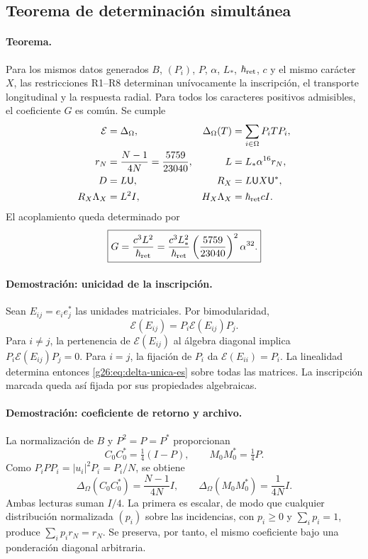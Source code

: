 \subsection{Teorema de determinación simultánea}

\paragraph{Teorema.}
Para los mismos datos generados \(B\), \((P_i)\), \(P\),
\(\alpha\), \(L_*\), \(\hbar_{\rm ret}\), \(c\) y el mismo carácter
\(X\), las restricciones R1--R8 determinan unívocamente la inscripción,
el transporte longitudinal y la respuesta radial. Para todos los
caracteres positivos admisibles, el coeficiente \(G\) es común. Se cumple
\begin{align}
 \mathcal E&=\Delta_\Omega,
 &\Delta_\Omega(T)&=\sum_{i\in\Omega}P_iTP_i,\label{g26:eq:delta-unica-es}\\
 r_N&=\frac{N-1}{4N}=\frac{5759}{23040},
 &L&=L_*\alpha^{16}r_N,\label{g26:eq:longitud-unica-es}\\
 D&=L\mathsf U,
 &R_X&=L\mathsf U X\mathsf U^*,\label{g26:eq:radial-unica-es}\\
 R_X\Lambda_X&=L^2I,
 &H_X\Lambda_X&=\hbar_{\rm ret}cI.\label{g26:eq:productos-radiales-es}
\end{align}
El acoplamiento queda determinado por
\begin{equation}
 \boxed{G=\frac{c^3L^2}{\hbar_{\rm ret}}
 =\frac{c^3L_*^2}{\hbar_{\rm ret}}
   \left(\frac{5759}{23040}\right)^2\alpha^{32}.}
 \label{g26:eq:g-rigido-es}
\end{equation}

\paragraph{Demostración: unicidad de la inscripción.}
Sean \(E_{ij}=e_ie_j^*\) las unidades matriciales. Por bimodularidad,
\[
 \mathcal E(E_{ij})=P_i\mathcal E(E_{ij})P_j.
\]
Para \(i\ne j\), la pertenencia de \(\mathcal E(E_{ij})\) al álgebra
diagonal implica \(P_i\mathcal E(E_{ij})P_j=0\). Para \(i=j\),
la fijación de \(P_i\) da \(\mathcal E(E_{ii})=P_i\).
La linealidad determina entonces \eqref{g26:eq:delta-unica-es} sobre todas
las matrices. La inscripción marcada queda así fijada por sus
propiedades algebraicas.

\paragraph{Demostración: coeficiente de retorno y archivo.}
La normalización de \(B\) y \(P^2=P=P^*\) proporcionan
\[
 C_0C_0^*=\tfrac14(I-P),\qquad M_0M_0^*=\tfrac14P.
\]
Como \(P_iPP_i=|u_i|^2P_i=P_i/N\), se obtiene
\begin{equation}
 \Delta_\Omega(C_0C_0^*)=\frac{N-1}{4N}I,
 \qquad
 \Delta_\Omega(M_0M_0^*)=\frac{1}{4N}I.
 \label{g26:eq:retorno-y-memoria-es}
\end{equation}
Ambas lecturas suman \(I/4\). La primera es escalar, de modo que
cualquier distribución normalizada \((p_i)\) sobre las incidencias,
con \(p_i\geq0\) y \(\sum_i p_i=1\), produce
\(\sum_i p_i r_N=r_N\). Se preserva, por tanto, el mismo coeficiente
bajo una ponderación diagonal arbitraria.

